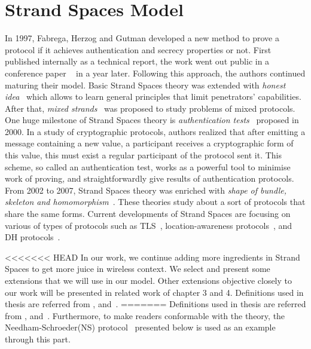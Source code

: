 
\chapter{Strand Spaces Model}\label{AppexA} %

\label{Strand Spaces Model} %


In 1997, Fabrega, Herzog and Gutman developed a new method to prove a protocol if it achieves authentication and secrecy properties or not. First published internally as a technical report, the work went out public in a conference paper ~\cite{674832} in a year later. Following this approach, the authors continued maturing their model. Basic Strand Spaces theory was extended with \emph{honest idea}~\cite{Thayer:1998:HIS:794198.795096} which allows to learn general principles that limit penetrators' capabilities. After that, \emph{mixed strands}~\cite{Thayer:1999:MSS:794199.795113} was proposed to study problems of mixed protocols. One huge milestone of Strand Spaces theory is \emph{authentication tests}~\cite{Guttman:2002:ATS:568264.568267} proposed in 2000. In a study of cryptographic protocols, authors realized that after emitting a message containing a new value, a participant receives a cryptographic form of this value, this must exist a regular participant of the protocol sent it. This scheme, so called an authentication test, works as a powerful tool to minimise work of proving, and straightforwardly give results of authentication protocols. From 2002 to 2007, Strand Spaces theory was enriched with \emph{shape of bundle, skeleton and homomorphism}~\cite{Doghmi:2007:SHS:1230146.1230260}. These theories study about a sort of protocols that share the same forms. Current developments of Strand Spaces are focusing on various of types of protocols such as TLS~\cite{Kamil:2011:ATS:2590701.2590707}, location-awareness protocols~\cite{Thayer:2010aa}, and DH protocols~\cite{1212716}. 

<<<<<<< HEAD
In our work, we continue adding more ingredients in Strand Spaces to get more juice in wireless context. We select and present some extensions that we will use in our model. Other extensions objective closely to our work will be presented in related work of chapter 3 and 4. Definitions used in thesis are referred from \cite{674832}, \cite{Guttman:2002:ATS:568264.568267} and~\cite{Doghmi:2007:SHS:1230146.1230260}. 
=======
Definitions used in thesis are referred from \cite{674832}, \cite{Guttman:2002:ATS:568264.568267} and~\cite{Doghmi:2007:SHS:1230146.1230260}. Furthermore, to make readers conformable with the theory, the Needham-Schroeder(NS) protocol~\cite{Needham:1978:UEA:359657.359659} presented below is used as an example through this part. 

